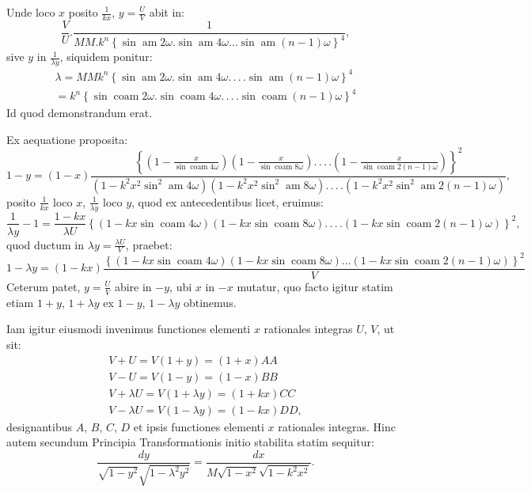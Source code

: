 \documentclass{article}
\begin{document}
Unde loco $x$ posito $\frac{1}{kx}$, $y=\frac{U}{V}$ abit in:
\[
\frac{V}{U}.\frac{1}{MM.k^{n}\left\{\sin\operatorname{am}2\omega.\sin\operatorname{am}4\omega\ldots\sin\operatorname{am}(n-1)\omega\right\}^{4}},
\]
sive $y$ in $\frac{1}{\lambda y}$, siquidem ponitur:
\[
\begin{gathered}
\lambda=MMk^{n}\left\{\sin\operatorname{am}2\omega.\sin\operatorname{am}4\omega.\,.\,.\,.\sin\operatorname{am}(n-1)\omega\right\}^{4}\\[1.5ex]
=k^{n}\left\{\sin\operatorname{coam}2\omega.\sin\operatorname{coam}4\omega.\,.\,.\,.\sin\operatorname{coam}(n-1)\omega\right\}^{4}
\end{gathered}
\]
Id quod demonstrandum erat.

Ex aequatione proposita:
\[
1-y=(1-x)\frac{\left\{\left(1-\frac{x}{\sin\operatorname{coam}4\omega}\right)\left(1-\frac{x}{\sin\operatorname{coam}8\omega}\right).\,.\,.\,.\left(1-\frac{x}{\sin\operatorname{coam}2(n-1)\omega}\right)\right\}^{2}}{\left(1-k^{2}x^{2}\sin^{2}\operatorname{am}4\omega\right)\left(1-k^{2}x^{2}\sin^{2}\operatorname{am}8\omega\right).\,.\,.\,.\left(1-k^{2}x^{2}\sin^{2}\operatorname{am}2(n-1)\omega\right)},
\]
posito $\frac{1}{kx}$ loco $x$, $\frac{1}{\lambda y}$ loco $y$, quod ex antecedentibus licet, eruimus:
\[
\frac{1}{\lambda y}-1=\frac{1-kx}{\lambda U}\left\{\left(1-kx\sin\operatorname{coam}4\omega\right)\left(1-kx\sin\operatorname{coam}8\omega\right).\,.\,.\,.\left(1-kx\sin\operatorname{coam}2(n-1)\omega\right)\right\}^{2},
\]
quod ductum in $\lambda y=\frac{\lambda U}{V}$, praebet:
\[
1-\lambda y=(1-kx)\frac{\left\{\left(1-kx\sin\operatorname{coam}4\omega\right)\left(1-kx\sin\operatorname{coam}8\omega\right)\ldots\left(1-kx\sin\operatorname{coam}2(n-1)\omega\right)\right\}^{2}}{V}
\]
Ceterum patet, $y=\frac{U}{V}$ abire in $-y$, ubi $x$ in $-x$ mutatur, quo facto igitur statim etiam $1+y$, $1+\lambda y$ ex $1-y$, $1-\lambda y$ obtinemus.

Iam igitur eiusmodi invenimus functiones elementi $x$ rationales integras $U$, $V$, ut sit:
\[
\begin{gathered}
V+U=V(1+y)=(1+x)AA\\
V-U=V(1-y)=(1-x)BB\\
V+\lambda U=V(1+\lambda y)=(1+kx)CC\\
V-\lambda U=V(1-\lambda y)=(1-kx)DD,
\end{gathered}
\]
designantibus $A$, $B$, $C$, $D$ et ipsis functiones elementi $x$ rationales integras. Hinc autem secundum Principia Transformationis initio stabilita statim sequitur:
\[
\frac{dy}{\sqrt{1-y^{2}}\sqrt{1-\lambda^{2}y^{2}}}=\frac{dx}{M\sqrt{1-x^{2}}\sqrt{1-k^{2}x^{2}}}.
\]
\end{document}
